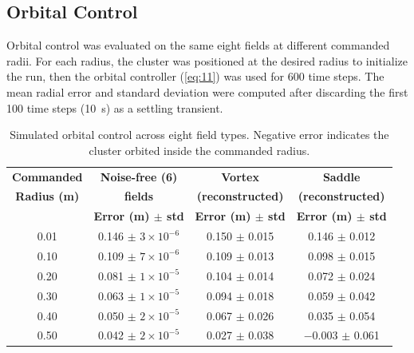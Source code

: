 \documentclass[lettersize,journal]{IEEEtran}
\begin{document}
\subsection{Orbital Control}

Orbital control was evaluated on the same eight fields at different commanded radii. For each radius, the cluster was positioned at the desired radius to initialize the run, then the orbital controller (\ref{eq:11}) was used for 600 time steps. The mean radial error and standard deviation were computed after discarding the first 100 time steps (10~s) as a settling transient.

\begin{table}[!t]
    \centering
    \caption{Simulated orbital control across eight field types. Negative error indicates the cluster orbited inside the commanded radius.}
    \label{tab:simulation_orbital_results}
    \footnotesize
    \setlength{\tabcolsep}{3pt}
    \begin{tabular}{cccc}
    \hline
    \textbf{Commanded} & \textbf{Noise-free (6)} & \textbf{Vortex} & \textbf{Saddle} \\
    \textbf{Radius (m)} & \textbf{fields} & \textbf{(reconstructed)} & \textbf{(reconstructed)} \\
     & \textbf{Error (m) $\pm$ std} & \textbf{Error (m) $\pm$ std} & \textbf{Error (m) $\pm$ std} \\
    \hline
    0.01 & 0.146 $\pm$ $3{\times}10^{-6}$ & 0.150 $\pm$ 0.015 & 0.146 $\pm$ 0.012 \\
    0.10 & 0.109 $\pm$ $7{\times}10^{-6}$ & 0.109 $\pm$ 0.013 & 0.098 $\pm$ 0.015 \\
    0.20 & 0.081 $\pm$ $1{\times}10^{-5}$ & 0.104 $\pm$ 0.014 & 0.072 $\pm$ 0.024 \\
    0.30 & 0.063 $\pm$ $1{\times}10^{-5}$ & 0.094 $\pm$ 0.018 & 0.059 $\pm$ 0.042 \\
    0.40 & 0.050 $\pm$ $2{\times}10^{-5}$ & 0.067 $\pm$ 0.026 & 0.035 $\pm$ 0.054 \\
    0.50 & 0.042 $\pm$ $2{\times}10^{-5}$ & 0.027 $\pm$ 0.038 & $-$0.003 $\pm$ 0.061 \\

    \hline
    \end{tabular}
    \end{table}
\end{document}
